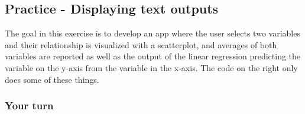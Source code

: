 \documentclass[
  letterpaper,
  DIV=11,
  numbers=noendperiod]{scrreprt}
\newenvironment{Shaded}{\begin{snugshade}}{\end{snugshade}}
\newcommand{\AttributeTok}[1]{\textcolor[rgb]{0.40,0.46,0.14}{#1}}
\newcommand{\CommentTok}[1]{\textcolor[rgb]{0.37,0.37,0.37}{#1}}
\newcommand{\ControlFlowTok}[1]{\textcolor[rgb]{0.00,0.46,0.62}{#1}}
\newcommand{\FunctionTok}[1]{\textcolor[rgb]{0.28,0.35,0.67}{#1}}
\newcommand{\NormalTok}[1]{\textcolor[rgb]{0.00,0.46,0.62}{#1}}
\newcommand{\OtherTok}[1]{\textcolor[rgb]{0.00,0.46,0.62}{#1}}
\newcommand{\SpecialCharTok}[1]{\textcolor[rgb]{0.37,0.37,0.37}{#1}}
\begin{document}
\begin{Shaded}
\end{Shaded}

\hypertarget{practice---displaying-text-outputs}{%
\subsection{Practice - Displaying text
outputs}\label{practice---displaying-text-outputs}}

The goal in this exercise is to develop an app where the user selects
two variables and their relationship is visualized with a scatterplot,
and averages of both variables are reported as well as the output of the
linear regression predicting the variable on the y-axis from the
variable in the x-axis. The code on the right only does some of these
things.

\hypertarget{your-turn-13}{%
\subsubsection{Your turn}\label{your-turn-13}}
\end{document}

